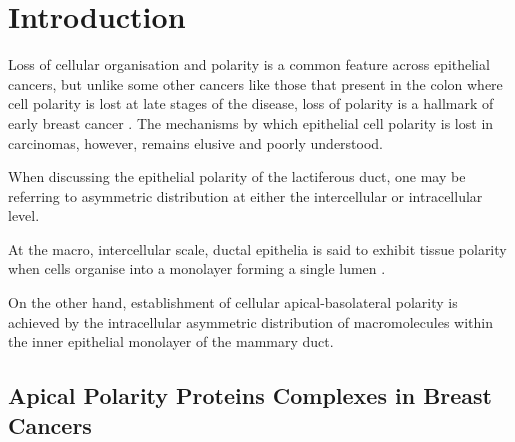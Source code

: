 \section{Introduction}

Loss of cellular organisation and polarity is a common feature across epithelial cancers, but unlike some other cancers like those that present in the colon where cell polarity is lost at late stages of the disease, loss of polarity is a hallmark of early breast cancer \citep{hinck2014}. The mechanisms by which epithelial cell polarity is lost in carcinomas, however, remains elusive and poorly understood.\par

When discussing the epithelial polarity of the lactiferous duct, one may be referring to asymmetric distribution at either the intercellular or intracellular level.\par

At the macro, intercellular scale, ductal epithelia is said to exhibit tissue polarity when cells organise into a monolayer forming a single lumen \citep{bissell2003}.\par

On the other hand, establishment of cellular apical-basolateral polarity is achieved by the intracellular asymmetric distribution of macromolecules within the inner epithelial monolayer of the mammary duct.

\subsection{Apical Polarity Proteins Complexes in Breast Cancers}

